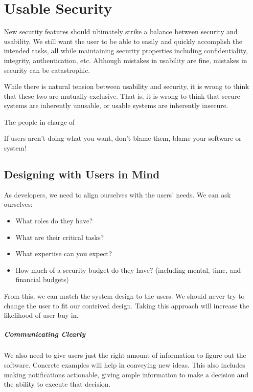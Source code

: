 \chapter{Usable Security}

New security features should ultimately strike a balance between security and usability. We still want the user to be able to easily and quickly accomplish the intended tasks, all while maintaining security properties including confidentiality, integrity, authentication, etc. Although mistakes in usability are fine, mistakes in security can be catastrophic.

While there is natural tension between usability and security, it is wrong to think that these two are mutually exclusive. That is, it is wrong to think that secure systems are inherently unusable, or usable systems are inherently insecure.

The people in charge of 

\begin{notebox}
    If users aren't doing what you want, don't blame them, blame your software or system!
\end{notebox}

\section{Designing with Users in Mind}

As developers, we need to align ourselves with the users' needs. We can ask ourselves:
\begin{itemize}[noitemsep]
    \item What roles do they have?
    \item What are their critical tasks?
    \item What expertise can you expect?
    \item How much of a security budget do they have? (including mental, time, and financial budgets)
\end{itemize}
From this, we can match the system design to the users. We should never try to change the user to fit our contrived design. Taking this approach will increase the likelihood of user buy-in.

\paragraph{Communicating Clearly}
We also need to give users just the right amount of information to figure out the software. Concrete examples will help in conveying new ideas. This also includes making notifications actionable, giving ample information to make a decision and the ability to execute that decision.

